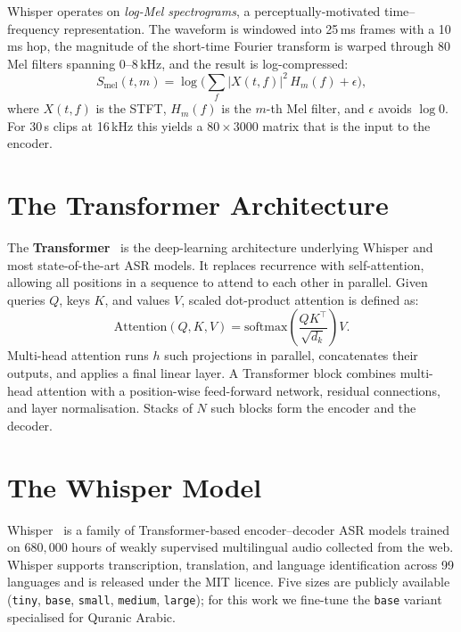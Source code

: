 \documentclass[12pt,a4paper]{report}
\begin{document}
Whisper operates on \emph{log-Mel spectrograms}, a perceptually-motivated
time--frequency representation. The waveform is windowed into 25\,ms frames
with a 10\,ms hop, the magnitude of the short-time Fourier transform is
warped through 80 Mel filters spanning 0--8\,kHz, and the result is
log-compressed:
\begin{equation}
\label{eq:mt_logmel}
S_{\mathrm{mel}}(t,m) = \log\!\Big( \sum_{f} |X(t,f)|^2 \, H_m(f) + \epsilon \Big),
\end{equation}
where $X(t,f)$ is the STFT, $H_m(f)$ is the $m$-th Mel filter, and
$\epsilon$ avoids $\log 0$. For 30\,s clips at 16\,kHz this yields a
$80\times 3000$ matrix that is the input to the encoder.

\section{The Transformer Architecture}
\label{sec:mt_transformer}

The \textbf{Transformer}~\cite{vaswani2017attention} is the deep-learning
architecture underlying Whisper and most state-of-the-art ASR models. It
replaces recurrence with self-attention, allowing all positions in a
sequence to attend to each other in parallel. Given queries $Q$, keys $K$,
and values $V$, scaled dot-product attention is defined as:
\begin{equation}
\label{eq:mt_attention}
\mathrm{Attention}(Q,K,V) = \mathrm{softmax}\!\left(\frac{QK^{\top}}{\sqrt{d_k}}\right) V.
\end{equation}
Multi-head attention runs $h$ such projections in parallel, concatenates
their outputs, and applies a final linear layer. A Transformer block
combines multi-head attention with a position-wise feed-forward network,
residual connections, and layer normalisation. Stacks of $N$ such blocks
form the encoder and the decoder.

\section{The Whisper Model}
\label{sec:mt_whisper}

\begin{emeraldbox}[title=Whisper (OpenAI, 2022)]
Whisper~\cite{radford2022whisper} is a family of Transformer-based
encoder--decoder ASR models trained on $680{,}000$ hours of weakly
supervised multilingual audio collected from the web. Whisper supports
transcription, translation, and language identification across 99
languages and is released under the MIT licence. Five sizes are publicly
available (\texttt{tiny}, \texttt{base}, \texttt{small}, \texttt{medium},
\texttt{large}); for this work we fine-tune the \texttt{base} variant
specialised for Quranic Arabic.
\end{emeraldbox}
\end{document}
